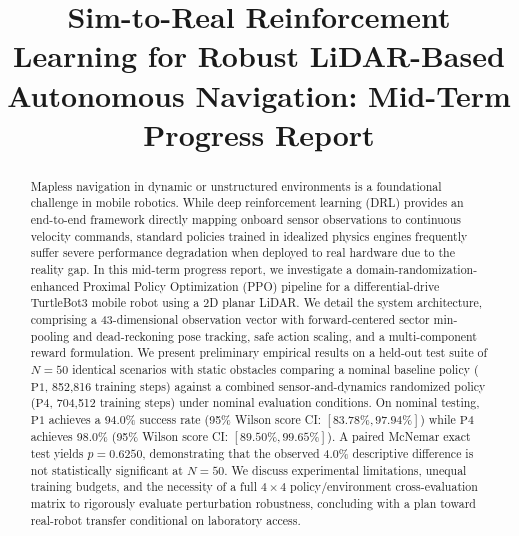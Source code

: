 \documentclass[conference]{IEEEtran}
\begin{document}
\title{Sim-to-Real Reinforcement Learning for Robust LiDAR-Based Autonomous Navigation: Mid-Term Progress Report}

\author{
\and
{}
}

\maketitle

\begin{abstract}
Mapless navigation in dynamic or unstructured environments is a foundational challenge in mobile robotics. While deep reinforcement learning (DRL) provides an end-to-end framework directly mapping onboard sensor observations to continuous velocity commands, standard policies trained in idealized physics engines frequently suffer severe performance degradation when deployed to real hardware due to the reality gap. In this mid-term progress report, we investigate a domain-randomization-enhanced Proximal Policy Optimization (PPO) pipeline for a differential-drive TurtleBot3 mobile robot using a 2D planar LiDAR. We detail the system architecture, comprising a 43-dimensional observation vector with forward-centered sector min-pooling and dead-reckoning pose tracking, safe action scaling, and a multi-component reward formulation. We present preliminary empirical results on a held-out test suite of $N=50$ identical scenarios with static obstacles comparing a nominal baseline policy ($\text{P1}$, 852,816 training steps) against a combined sensor-and-dynamics randomized policy ($\text{P4}$, 704,512 training steps) under nominal evaluation conditions. On nominal testing, $\text{P1}$ achieves a 94.0\% success rate (95\% Wilson score CI: $[83.78\%, 97.94\%]$) while $\text{P4}$ achieves 98.0\% (95\% Wilson score CI: $[89.50\%, 99.65\%]$). A paired McNemar exact test yields $p = 0.6250$, demonstrating that the observed 4.0\% descriptive difference is not statistically significant at $N=50$. We discuss experimental limitations, unequal training budgets, and the necessity of a full $4 \times 4$ policy/environment cross-evaluation matrix to rigorously evaluate perturbation robustness, concluding with a plan toward real-robot transfer conditional on laboratory access.
\end{abstract}
\end{document}
